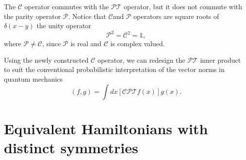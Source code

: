 \documentclass[12pt, a4paper]{report}
\newcommand\PT{\(\mathcal{PT}\)}
\newcommand\PP{\(\mathcal{P}\)}
\newcommand\CC{\(\mathcal{C}\)}
\begin{document}
The \CC\: operator commutes with the \PT\: operator, but it does not commute with the parity operator \PP. Notice that \CC\:and \PP\: operators are square roots of $\delta(x-y)$ the unity operator\cite{ComplexExtension}
\begin{equation}\label{eq:9}
\mathcal{P}^2 = \mathcal{C}^2 = \mathds{1}, 
\end{equation}
where $\mathcal{P} \neq \mathcal{C}$, since \PP\: is real and \CC\: is complex valued\cite{MustaHbeHermitian}\cite{Bender_2004}.

Using the newly constructed \CC\: operator, we can redesign the \PT\: inner product to suit the conventional probabilistic interpretation of the vector norms in quantum mechanics
\begin{equation}\label{eq:10}
\left( f, g \right ) = \int dx \left [ \mathcal{CPT} f(x) \right ] g(x).
\end{equation}

\chapter{Equivalent Hamiltonians with distinct symmetries}\label{Equiv}
\end{document}
